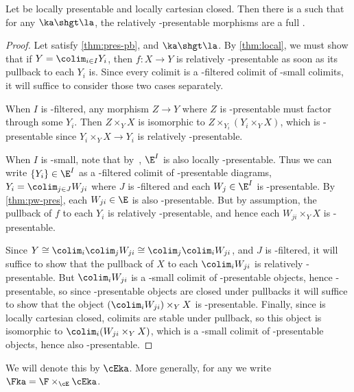 \begin{prop}\label{thm:relpres-local}
  Let \E be locally presentable and locally cartesian closed.
  Then there is a \la such that for any $\ka\shgt\la$, the relatively \ka-presentable morphisms are a \local full \nfs.
\end{prop}
\begin{proof}
  Let \la satisfy \cref{thm:pres-pb}, and $\ka\shgt\la$.
  By \cref{thm:local}, we must show that if $Y = \colim_{i\in I} Y_i$, then $f:X\to Y$ is relatively \ka-presentable as soon as its pullback to each $Y_i$ is.
  Since every colimit is a \ka-filtered colimit of \ka-small colimits, it will suffice to consider those two cases separately.

  When $I$ is \ka-filtered, any morphism $Z\to Y$ where $Z$ is \ka-presentable must factor through some $Y_i$.
  Then $Z\times_Y X$ is isomorphic to $Z\times_{Y_i} (Y_i \times_Y X)$, which is \ka-presentable since $Y_i \times_Y X \to Y_i$ is relatively \ka-presentable.

  When $I$ is \ka-small, note that by~\cite[Corollary 1.54]{ar:loc-pres}, $\E^I$ is also locally \ka-presentable.
  Thus we can write $\{Y_i\}\in\E^I$ as a \ka-filtered colimit of \ka-presentable diagrams, $Y_i = \colim_{j\in J} W_{j i}$ where $J$ is \ka-filtered and each $W_j\in \E^I$ is \ka-presentable.
  By \cref{thm:pw-pres}, each $W_{j i}\in \E$ is also \ka-presentable.
  But by assumption, the pullback of $f$ to each $Y_i$ is relatively \ka-presentable, and hence each $W_{j i} \times_Y X$ is \ka-presentable.

  Since $Y \cong \colim_i \colim_j W_{j i} \cong \colim_j \colim_i W_{j i}$, and $J$ is \ka-filtered, it will suffice to show that the pullback of $X$ to each $\colim_i W_{j i}$ is relatively \ka-presentable.
  But $\colim_i W_{j i}$ is a \ka-small colimit of \ka-presentable objects, hence \ka-presentable, so since \ka-presentable objects are closed under pullbacks it will suffice to show that the object $(\colim_i W_{j i}) \times_Y X$ is \ka-presentable.
  Finally, since \E is locally cartesian closed, colimits are stable under pullback, so this object is isomorphic to $\colim_i (W_{j i}\times_Y X)$, which is a \ka-small colimit of \ka-presentable objects, hence also \ka-presentable.
\end{proof}

We will denote this \nfs by $\cEka$.
More generally, for any \nfs \F we write $\Fka = \F \times_\cE \cEka$.


